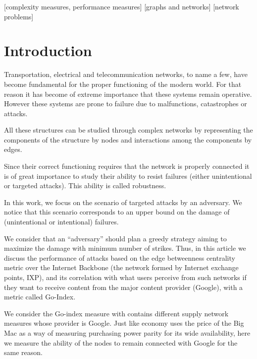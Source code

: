 \documentclass{sig-alternate-10pt}
\begin{document}
[complexity measures, performance measures]
[graphs and networks]
[network problems]


\section{Introduction}

Transportation, electrical and telecommunication networks, to name a few, have become fundamental for the proper functioning of the modern world. For that reason it has become of extreme importance that these systems remain operative. However these systems are prone to failure due to malfunctions, catastrophes or attacks.

All these structures can be studied through complex networks by representing the components of the structure by nodes and interactions among the components by edges.

Since their correct functioning requires that the network is properly connected it is of great importance to study their ability to resist failures (either unintentional or targeted attacks). This ability is called robustness.

In this work, we focus on the scenario of targeted attacks by an adversary. We notice that this scenario corresponds to an upper bound on the damage of (unintentional or intentional) failures. 

We consider that an ``adversary'' should plan a greedy strategy aiming to maximize the damage with minimum number of strikes.
Thus, in this article we discuss the performance of attacks based on the edge betweenness centrality metric \cite{bersano2012metrics} over the Internet Backbone (the network formed by Internet exchange points, IXP), and its correlation with what users perceive from such networks if they want to receive content from the major content provider (Goo\-gle), with a metric called Go-Index.

We consider the Go-index measure with contains different supply network measures whose provider is Goo\-gle.
Just like economy uses the price of the Big Mac as a way of measuring purchasing power parity for its wide availability, 
here we measure the ability of the nodes to remain connected with Google for the same reason.
\end{document}

